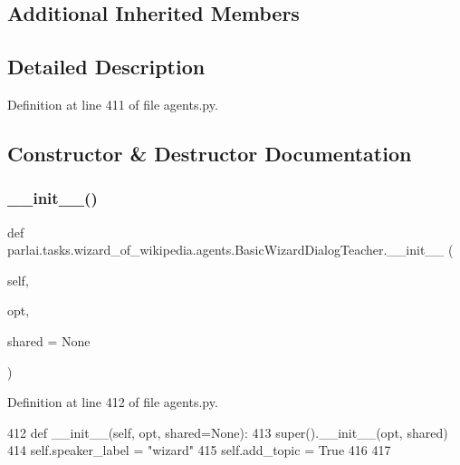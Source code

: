 \subsection*{Additional Inherited Members}


\subsection{Detailed Description}


Definition at line 411 of file agents.\+py.



\subsection{Constructor \& Destructor Documentation}
\mbox{\label{classparlai_1_1tasks_1_1wizard__of__wikipedia_1_1agents_1_1BasicWizardDialogTeacher_acdbd15d6e87bcc9e1c0482284a8119ec}} 
\subsubsection{\texorpdfstring{\+\_\+\+\_\+init\+\_\+\+\_\+()}{\_\_init\_\_()}}
{\footnotesize\ttfamily def parlai.\+tasks.\+wizard\+\_\+of\+\_\+wikipedia.\+agents.\+Basic\+Wizard\+Dialog\+Teacher.\+\_\+\+\_\+init\+\_\+\+\_\+ (\begin{DoxyParamCaption}\item[{}]{self,  }\item[{}]{opt,  }\item[{}]{shared = {\ttfamily None} }\end{DoxyParamCaption})}



Definition at line 412 of file agents.\+py.


\begin{DoxyCode}
412     \textcolor{keyword}{def }\_\_init\_\_(self, opt, shared=None):
413         super().\_\_init\_\_(opt, shared)
414         self.speaker\_label = \textcolor{stringliteral}{"wizard"}
415         self.add\_topic = \textcolor{keyword}{True}
416 
417 
\end{DoxyCode}


